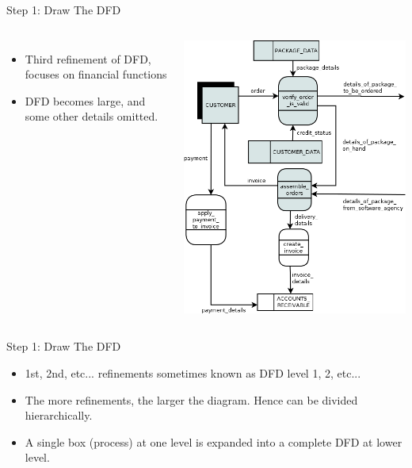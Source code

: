 \documentclass{beamer}
\begin{document}
	\begin{frame}{Step 1: Draw The DFD}
		\begin{columns}[t,totalwidth=\textwidth]
				\begin{itemize}
					\item Third refinement of DFD, focuses on financial functions
					\item DFD becomes large, and some other details omitted.
				\end{itemize}
				\begin{flushright}
					\includegraphics[scale=0.3]{img/01_sally_dfd_third_refinement}
				\end{flushright}
		\end{columns}
	\end{frame}
	\begin{frame}{Step 1: Draw The DFD}
		\begin{itemize}
			\item 1st, 2nd, etc... refinements sometimes known as DFD level 1, 2, etc... %
			\item The more refinements, the larger the diagram. Hence can be divided hierarchically.
			\item A single box (process) at one level is expanded into a complete DFD at lower level.
		\end{itemize}
	\end{frame}
\end{document}
